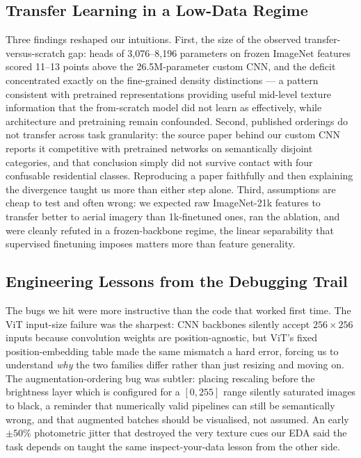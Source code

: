 \documentclass[11pt,twoside,a4paper]{article}
\begin{document}
\subsection{Transfer Learning in a Low-Data Regime}

Three findings reshaped our intuitions. First, the size of the observed
transfer-versus-scratch gap: heads of 3,076--8,196 parameters on frozen ImageNet
features scored 11--13 points above the 26.5M-parameter custom CNN,
and the deficit concentrated exactly on the fine-grained density distinctions
--- a pattern consistent with pretrained representations providing useful
mid-level texture information that the from-scratch model did not learn as
effectively, while architecture and pretraining remain confounded. Second,
published orderings do not transfer across task granularity:
the source paper behind our custom CNN reports it competitive with pretrained
networks on semantically disjoint categories, and that conclusion simply did
not survive contact with four confusable residential classes. Reproducing a
paper faithfully and then explaining the divergence taught us more than
either step alone. Third, assumptions are cheap to test and often wrong: we
expected raw ImageNet-21k features to transfer better to aerial imagery than
1k-finetuned ones, ran the ablation, and were cleanly refuted in a
frozen-backbone regime, the linear separability that supervised finetuning
imposes matters more than feature generality.

\subsection{Engineering Lessons from the Debugging Trail}

The bugs we hit were more instructive than the code that worked first time.
The ViT input-size failure was the sharpest: CNN backbones silently accept
$256 \times 256$ inputs because convolution weights are position-agnostic,
but ViT's fixed position-embedding table made the same mismatch a hard error,
forcing us to understand \emph{why} the two families differ rather than just
resizing and moving on. The augmentation-ordering bug was subtler: placing
rescaling before the brightness layer which is configured for a
$[0,255]$ range silently saturated images to black, a reminder that
numerically valid pipelines can still be semantically wrong, and that
augmented batches should be visualised, not assumed. An early $\pm 50\%$
photometric jitter that destroyed the very texture cues our EDA said the task
depends on taught the same inspect-your-data lesson from the other side.
\end{document}
